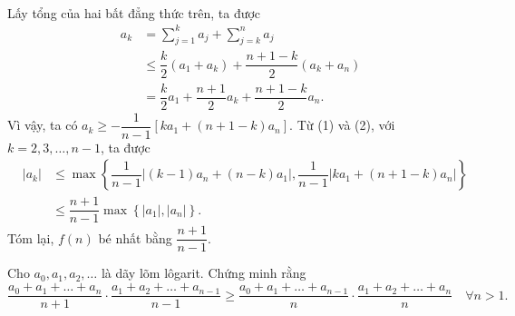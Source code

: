 {\begin{eqnarray*}
			\end{eqnarray*} 
			Lấy tổng của hai bất đẳng thức trên, ta được 
			\begin{eqnarray*}
				& a_k & = \displaystyle \sum_{j=1}^{k} a_j + \displaystyle \sum_{j=k}^{n} a_j \\
				& & \le \dfrac{k}{2} \left(a_1+a_k\right) + \dfrac{n+1-k}{2} \left(a_k+a_n\right) \\
				& & = \dfrac{k}{2} a_1 +\dfrac{n+1}{2} a_k + \dfrac{n+1-k}{2} a_n.
			\end{eqnarray*}
			Vì vậy, ta có $a_k \ge -\dfrac{1}{n-1} \left[ ka_1 + (n+1-k) a_n \right]$. 
			\noindent Từ (1) và (2), với $k=2,3,\ldots,n-1$, ta được
			\begin{eqnarray*}
				& \left| a_k \right| & \le \max \left\{ \dfrac{1}{n-1} \left| (k-1)a_n +(n-k)a_1 \right|, \dfrac{1}{n-1} \left| ka_1 + (n+1-k)a_n \right| \right\} \\
				& & \le \dfrac{n+1}{n-1} \max \left\{ |a_1|,|a_n| \right\}.
			\end{eqnarray*}
			Tóm lại, $f(n)$ bé nhất bằng $\dfrac{n+1}{n-1}$.
		}
		
		\begin{vd}[USA MO, 1993]%
			Cho $a_0,a_1,a_2,\ldots$ là dãy lõm lôgarit. Chứng minh rằng $$\dfrac{a_0+a_1+\ldots+a_n}{n+1} \cdot \dfrac{a_1+a_2+\ldots+a_{n-1}}{n-1} \ge \dfrac{a_0+a_1+\ldots+a_{n-1}}{n} \cdot \dfrac{a_1+a_2+\ldots+a_n}{n} \quad \forall n>1.$$
		\end{vd}
		
